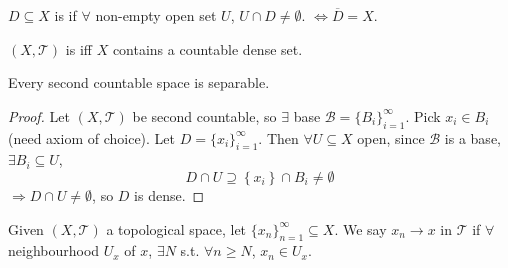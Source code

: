 \begin{defn} 
    $D \subseteq X$ is  if $\forall $ non-empty open set $U$, $U \cap D \neq \emptyset$.
    $\iff \overline{D} = X$.
    
    $(X, \mathcal{T})$ is  iff $X$ contains a countable dense set.  
    
\end{defn}

\begin{prop}
    Every second countable space is separable.
\end{prop}

\begin{proof}
    Let $(X, \mathcal{T})$ be second countable, so $\exists $ base $\mathcal{B} = 
    \{B_{i}\}_{i=1}^{\infty} $. Pick $x_i \in B_i$ (need axiom of choice).
    Let $D = \{x_{i}\}_{i=1}^{\infty} $. Then $\forall U \subseteq X$ open, since $\mathcal{B}$
    is a base, $\exists B_i \subseteq U$, 
    \[
        D \cap U \supseteq \left\{ x_i \right\} \cap B_i \neq \emptyset 
    \] 
    $\Rightarrow D \cap U \neq \emptyset$, so $D$ is dense.  
\end{proof}

\begin{defn}
    Given $(X, \mathcal{T})$ a topological space, let $\{x_{n}\}_{n=1}^{\infty} \subseteq X$.
    We say $x_n \to x$ in $\mathcal{T}$ if $\forall$ neighbourhood $U_x$ of $x$, $\exists N$ s.t.
    $\forall n \geq N$, $x_n \in U_x$.        
    
\end{defn}

